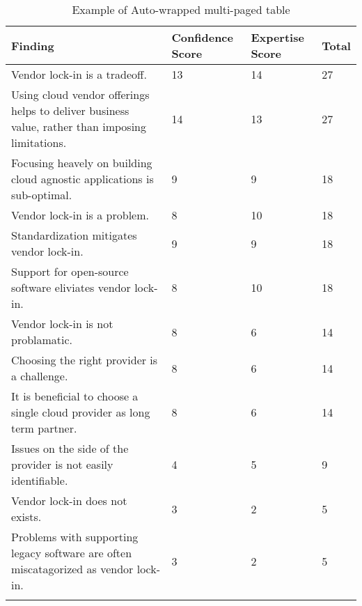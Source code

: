 
\renewcommand\arraystretch{1.5}%
\begin{longtable}{|p{10cm}|p{2cm}|p{2cm}|}
\hline
\textbf{Finding}  & \textbf{Confidence Score} & \textbf{Expertise Score} & \textbf{Total} \\ \hline
\endhead
Vendor lock-in is a tradeoff. & 13 & 14 & 27 \\ \hline
Using cloud vendor offerings helps to deliver business value, rather than imposing limitations. & 14 & 13 & 27 \\ \hline
Focusing heavely on building cloud agnostic applications is sub-optimal. & 9 & 9 & 18 \\ \hline
Vendor lock-in is a problem. & 8 & 10 & 18 \\ \hline
Standardization mitigates vendor lock-in. & 9 & 9 & 18 \\ \hline
Support for open-source software eliviates vendor lock-in. & 8 & 10 & 18 \\ \hline
Vendor lock-in is not problamatic. & 8 & 6 & 14 \\ \hline
Choosing the right provider is a challenge. & 8 & 6 & 14 \\ \hline
It is beneficial to choose a single cloud provider as long term partner. & 8 & 6 & 14 \\ \hline
Issues on the side of the provider is not easily identifiable. & 4 & 5 & 9 \\ \hline
Vendor lock-in does not exists. & 3 & 2 & 5 \\ \hline
Problems with supporting legacy software are often miscatagorized as vendor lock-in. & 3 & 2 & 5 \\ \hline
\caption{Example of Auto-wrapped multi-paged table}
\label{tab:table1}
\end{longtable}
